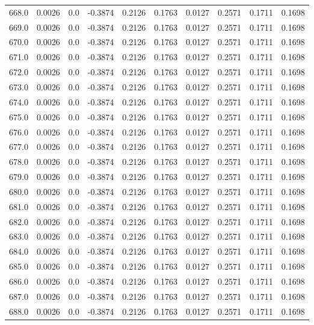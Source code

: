 \begin{longtable}{lrrrrrrrrr}
668.0 & 0.0026 & 0.0 & -0.3874 & 0.2126 & 0.1763 & 0.0127 & 0.2571 & 0.1711 & 0.1698 \\
669.0 & 0.0026 & 0.0 & -0.3874 & 0.2126 & 0.1763 & 0.0127 & 0.2571 & 0.1711 & 0.1698 \\
670.0 & 0.0026 & 0.0 & -0.3874 & 0.2126 & 0.1763 & 0.0127 & 0.2571 & 0.1711 & 0.1698 \\
671.0 & 0.0026 & 0.0 & -0.3874 & 0.2126 & 0.1763 & 0.0127 & 0.2571 & 0.1711 & 0.1698 \\
672.0 & 0.0026 & 0.0 & -0.3874 & 0.2126 & 0.1763 & 0.0127 & 0.2571 & 0.1711 & 0.1698 \\
673.0 & 0.0026 & 0.0 & -0.3874 & 0.2126 & 0.1763 & 0.0127 & 0.2571 & 0.1711 & 0.1698 \\
674.0 & 0.0026 & 0.0 & -0.3874 & 0.2126 & 0.1763 & 0.0127 & 0.2571 & 0.1711 & 0.1698 \\
675.0 & 0.0026 & 0.0 & -0.3874 & 0.2126 & 0.1763 & 0.0127 & 0.2571 & 0.1711 & 0.1698 \\
676.0 & 0.0026 & 0.0 & -0.3874 & 0.2126 & 0.1763 & 0.0127 & 0.2571 & 0.1711 & 0.1698 \\
677.0 & 0.0026 & 0.0 & -0.3874 & 0.2126 & 0.1763 & 0.0127 & 0.2571 & 0.1711 & 0.1698 \\
678.0 & 0.0026 & 0.0 & -0.3874 & 0.2126 & 0.1763 & 0.0127 & 0.2571 & 0.1711 & 0.1698 \\
679.0 & 0.0026 & 0.0 & -0.3874 & 0.2126 & 0.1763 & 0.0127 & 0.2571 & 0.1711 & 0.1698 \\
680.0 & 0.0026 & 0.0 & -0.3874 & 0.2126 & 0.1763 & 0.0127 & 0.2571 & 0.1711 & 0.1698 \\
681.0 & 0.0026 & 0.0 & -0.3874 & 0.2126 & 0.1763 & 0.0127 & 0.2571 & 0.1711 & 0.1698 \\
682.0 & 0.0026 & 0.0 & -0.3874 & 0.2126 & 0.1763 & 0.0127 & 0.2571 & 0.1711 & 0.1698 \\
683.0 & 0.0026 & 0.0 & -0.3874 & 0.2126 & 0.1763 & 0.0127 & 0.2571 & 0.1711 & 0.1698 \\
684.0 & 0.0026 & 0.0 & -0.3874 & 0.2126 & 0.1763 & 0.0127 & 0.2571 & 0.1711 & 0.1698 \\
685.0 & 0.0026 & 0.0 & -0.3874 & 0.2126 & 0.1763 & 0.0127 & 0.2571 & 0.1711 & 0.1698 \\
686.0 & 0.0026 & 0.0 & -0.3874 & 0.2126 & 0.1763 & 0.0127 & 0.2571 & 0.1711 & 0.1698 \\
687.0 & 0.0026 & 0.0 & -0.3874 & 0.2126 & 0.1763 & 0.0127 & 0.2571 & 0.1711 & 0.1698 \\
688.0 & 0.0026 & 0.0 & -0.3874 & 0.2126 & 0.1763 & 0.0127 & 0.2571 & 0.1711 & 0.1698 \\

\end{longtable}
